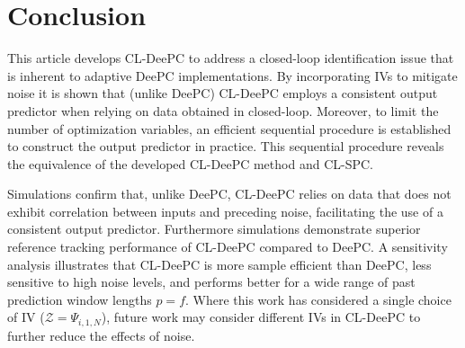 \section{Conclusion}
\noindent This article develops \ac{CL-DeePC} to address a closed-loop identification issue that is inherent to adaptive \ac{DeePC} implementations. By incorporating \ac{IVs} to mitigate noise it is shown that (unlike \ac{DeePC}) \ac{CL-DeePC} employs a consistent output predictor when relying on data obtained in closed-loop. Moreover, to limit the number of optimization variables, an efficient sequential procedure is established to construct the output predictor in practice. This sequential procedure reveals the equivalence of the developed \ac{CL-DeePC} method and \ac{CL-SPC}.

Simulations confirm that, unlike \ac{DeePC}, \ac{CL-DeePC} relies on data that does not exhibit correlation between inputs and preceding noise, facilitating the use of a consistent output predictor. Furthermore simulations demonstrate superior reference tracking performance of \ac{CL-DeePC} compared to \ac{DeePC}. A sensitivity analysis illustrates that \ac{CL-DeePC} is more sample efficient than \ac{DeePC}, less sensitive to high noise levels, and performs better for a wide range of past prediction window lengths $p=f$. Where this work has considered a single choice of \ac{IV} ($\mathcal{Z}=\Psi_{i,1,N}$), future work may consider different \ac{IVs} in \ac{CL-DeePC} to further reduce the effects of noise.
